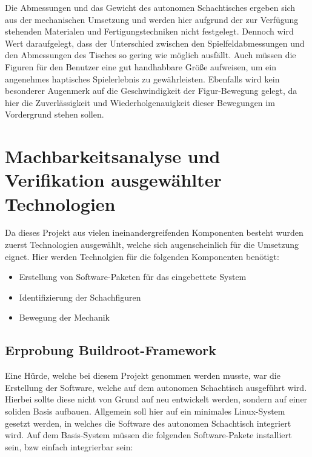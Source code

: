 Die Abmessungen und das Gewicht des autonomen Schachtisches ergeben sich
aus der mechanischen Umsetzung und werden hier aufgrund der zur
Verfügung stehenden Materialen und Fertigungstechniken nicht festgelegt.
Dennoch wird Wert daraufgelegt, dass der Unterschied zwischen den
Spielfeldabmessungen und den Abmessungen des Tisches so gering wie
möglich ausfällt. Auch müssen die Figuren für den Benutzer eine gut
handhabbare Größe aufweisen, um ein angenehmes haptisches Spielerlebnis
zu gewährleisten. Ebenfalls wird kein besonderer Augenmerk auf die
Geschwindigkeit der Figur-Bewegung gelegt, da hier die Zuverlässigkeit
und Wiederholgenauigkeit dieser Bewegungen im Vordergrund stehen sollen.

\hypertarget{machbarkeitsanalyse-und-verifikation-ausgewuxe4hlter-technologien}{%
\chapter{Machbarkeitsanalyse und Verifikation ausgewählter
Technologien}\label{machbarkeitsanalyse-und-verifikation-ausgewuxe4hlter-technologien}}

Da dieses Projekt aus vielen ineinandergreifenden Komponenten besteht
wurden zuerst Technologien ausgewählt, welche sich augenscheinlich für
die Umsetzung eignet. Hier werden Technolgien für die folgenden
Komponenten benötigt:

\begin{itemize}
\tightlist
\item
  Erstellung von Software-Paketen für das eingebettete System
\item
  Identifizierung der Schachfiguren
\item
  Bewegung der Mechanik
\end{itemize}

\hypertarget{erprobung-buildroot-framework}{%
\section{Erprobung
Buildroot-Framework}\label{erprobung-buildroot-framework}}

Eine Hürde, welche bei diesem Projekt genommen werden musste, war die
Erstellung der Software, welche auf dem autonomen Schachtisch ausgeführt
wird. Hierbei sollte diese nicht von Grund auf neu entwickelt werden,
sondern auf einer soliden Basis aufbauen. Allgemein soll hier auf ein
minimales Linux-System gesetzt werden, in welches die Software des
autonomen Schachtisch integriert wird. Auf dem Basis-System müssen die
folgenden Software-Pakete installiert sein, bzw einfach integrierbar
sein:

